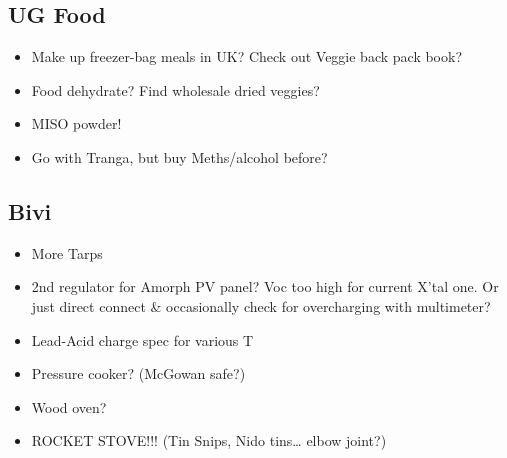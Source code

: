     \subsection{UG Food}
        \begin{itemize}
            \item Make up freezer-bag meals in UK? Check out Veggie back pack book?
            \item Food dehydrate? Find wholesale dried veggies?
            \item MISO powder!
            \item Go with Tranga, but buy Meths/alcohol before?
        \end{itemize}
        

    \subsection{Bivi}
        \begin{itemize}
            \item More Tarps
            \item 2nd regulator for Amorph PV panel? Voc too high for current X'tal one. Or just direct connect \& occasionally check for overcharging with multimeter?
            \item Lead-Acid charge spec for various T
            \item Pressure cooker? (McGowan safe?)
            \item Wood oven?
            \item ROCKET STOVE!!! (Tin Snips, Nido tins\ldots{} elbow joint?)
        \end{itemize}
        
